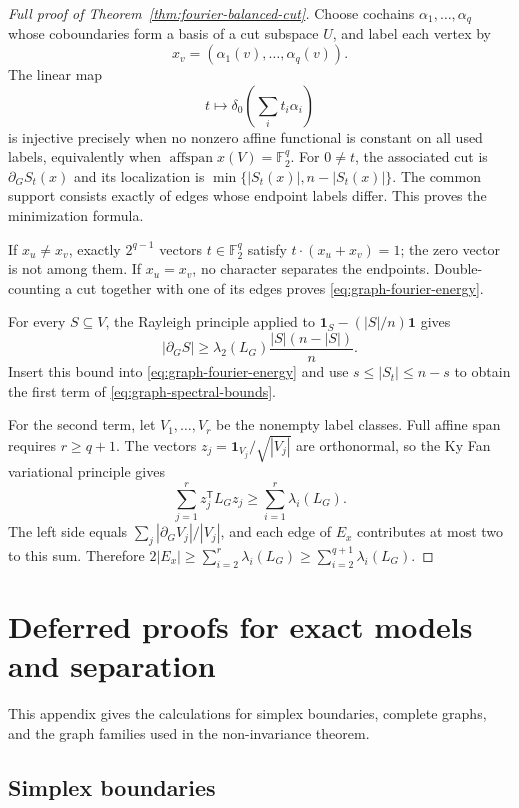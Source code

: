 \documentclass[11pt,letterpaper]{article}
\theoremstyle{plain}
\theoremstyle{definition}
\newcommand{\F}{\mathbb{F}_2}
\newcommand{\1}{\mathbf{1}}
\newcommand{\abs}[1]{\left|#1\right|}
\begin{document}
\begin{proof}[Full proof of Theorem~\ref{thm:fourier-balanced-cut}]
Choose cochains $\alpha_1,\ldots,\alpha_q$ whose coboundaries form a basis of a cut
subspace $U$, and label each vertex by
\[
 x_v=(\alpha_1(v),\ldots,\alpha_q(v)).
\]
The linear map
\[
 t\longmapsto\delta_0\left(\sum_i t_i\alpha_i\right)
\]
is injective precisely when no nonzero affine functional is constant on all used labels,
equivalently when $\operatorname{affspan}x(V)=\F^q$.  For $0\ne t$, the associated
cut is $\partial_G S_t(x)$ and its localization is
$\min\{\abs{S_t(x)},n-\abs{S_t(x)}\}$.  The common support consists exactly of
edges whose endpoint labels differ.  This proves the minimization formula.

If $x_u\ne x_v$, exactly $2^{q-1}$ vectors $t\in\F^q$ satisfy
$t\cdot(x_u+x_v)=1$; the zero vector is not among them.  If $x_u=x_v$, no character
separates the endpoints.  Double-counting a cut together with one of its edges proves
\eqref{eq:graph-fourier-energy}.

For every $S\subseteq V$, the Rayleigh principle applied to
$\1_S-(\abs S/n)\1$ gives
\[
 \abs{\partial_G S}\ge
 \lambda_2(L_G)\frac{\abs S(n-\abs S)}{n}.
\]
Insert this bound into \eqref{eq:graph-fourier-energy} and use
$s\le\abs{S_t}\le n-s$ to obtain the first term of
\eqref{eq:graph-spectral-bounds}.

For the second term, let $V_1,\ldots,V_r$ be the nonempty label classes.  Full affine
span requires $r\ge q+1$.  The vectors
$z_j=\1_{V_j}/\sqrt{\abs{V_j}}$ are orthonormal, so the Ky Fan variational principle
gives
\[
 \sum_{j=1}^r z_j^{\mathsf T}L_G z_j
 \ge\sum_{i=1}^r\lambda_i(L_G).
\]
The left side equals
$\sum_j\abs{\partial_G V_j}/\abs{V_j}$, and each edge of $E_x$ contributes at most two
to this sum.  Therefore
$2\abs{E_x}\ge\sum_{i=2}^r\lambda_i(L_G)\ge\sum_{i=2}^{q+1}\lambda_i(L_G)$.
\end{proof}

\section{Deferred proofs for exact models and separation}
\label{app:exact-proofs}

This appendix gives the calculations for simplex boundaries, complete graphs, and the
graph families used in the non-invariance theorem.

\subsection{Simplex boundaries}
\label{app:simplex-proof}
\end{document}
